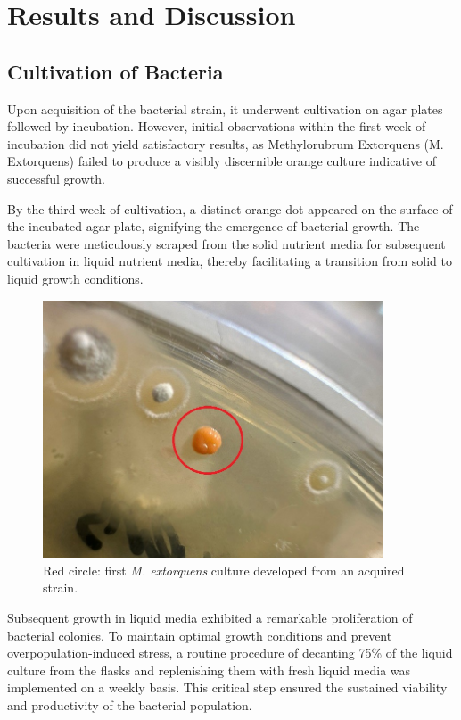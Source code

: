 \chapter{Results and Discussion}

\section{Cultivation of Bacteria\authorB}
Upon acquisition of the bacterial strain, it underwent cultivation on agar plates followed by
incubation. However, initial observations within the first week of incubation did not yield
satisfactory results, as Methylorubrum Extorquens (M. Extorquens) failed to produce a visibly
discernible orange culture indicative of successful growth.

By the third week of cultivation, a distinct orange dot appeared on the surface of the incubated
agar plate, signifying the emergence of bacterial growth. The bacteria were meticulously scraped
from the solid nutrient media for subsequent cultivation in liquid nutrient media, thereby
facilitating a transition from solid to liquid growth conditions.

\begin{figure}[H]
    \centering
    \includegraphics[width=0.9\textwidth]{./media/images/first_mextorquens}
    \caption{Red circle: first \emph{M. extorquens} culture developed from an acquired strain.}
    \label{fig:first_mextorquens}
\end{figure}

Subsequent growth in liquid media exhibited a remarkable proliferation of bacterial colonies. To
maintain optimal growth conditions and prevent overpopulation-induced stress, a routine
procedure of decanting 75\% of the liquid culture from the flasks and replenishing them with fresh
liquid media was implemented on a weekly basis. This critical step ensured the sustained viability
and productivity of the bacterial population.

